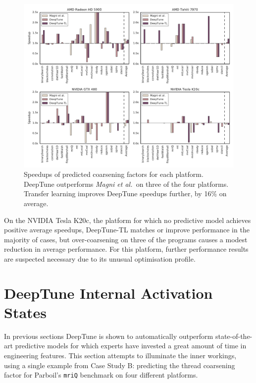 \begin{figure}
	\centering %
	\includegraphics[width=\textwidth]{img/pact-speedup}%
	\caption[Speedups of predicted thread coarsening factors]{%
		Speedups of predicted coarsening factors for each platform. DeepTune outperforms \emph{Magni et al.\ }on three of the four platforms. Transfer learning improves DeepTune speedups further, by 16\% on average.%
	}%
	\label{fig:pact-speedup}
\end{figure}

On the NVIDIA Tesla K20c, the platform for which no predictive model achieves positive average speedups, DeepTune-TL matches or improve performance in the majority of cases, but over-coarsening on three of the programs causes a modest reduction in average performance. For this platform, further performance results are suspected necessary due to its unusual optimisation profile.


\section{DeepTune Internal Activation States}
\label{subsec:deeptune-internal-states}

In previous sections DeepTune is shown to automatically outperform state-of-the-art predictive models for which experts have invested a great amount of time in engineering features. This section attempts to illuminate the inner workings, using a single example from Case Study B: predicting the thread coarsening factor for Parboil's \texttt{mriQ} benchmark on four different platforms.

